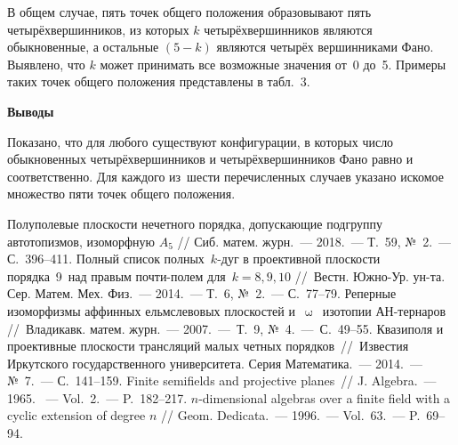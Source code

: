 В общем случае, пять точек общего положения образовывают пять  четырёхвершинников, из которых $k$ четырёхвершинников являются обыкновенные, а остальные $(5-k)$ являются четырёх вершинниками Фано. Выявлено, что $k$ может принимать все возможные значения от~0 до~5. Примеры таких точек общего положения представлены в табл.~3.


\textbf{Выводы}

Показано, что для любого существуют конфигурации, в которых число обыкновенных четырёхвершинников и четырёхвершинников Фано равно и
соответственно. Для каждого из~шести перечисленных случаев указано искомое множество пяти точек общего положения.




\begin{thebibliography}{99}

\bibitem{} Полуполевые плоскости нечетного порядка, допускающие подгруппу автотопизмов, изоморфную $A_5$ // Сиб. матем. журн.~--- 2018.~--- Т.~59, №~2.~--- С.~396--411.
\bibitem{} Полный список полных $k$-дуг в проективной плоскости порядка 9 над правым почти-полем для $k=8, 9, 10$ // Вестн. Южно-Ур. ун-та. Сер. Матем. Мех. Физ.~--- 2014.~--- Т.~6, №~2.~--- С.~77--79.
\bibitem{} Реперные изоморфизмы аффинных ельмслевовых плоскостей и $\upomega$ изотопии АН-тернаров // Владикавк. матем. журн.~--- 2007.~--- Т.~9, №~4.~--- С.~49--55.
\bibitem{} Квазиполя и проективные плоскости трансляций малых четных порядков~// Известия Иркутского государственного университета. Серия Математика.~--- 2014.~--- №~7.~--- С.~141--159.
\bibitem{} Finite semifields and projective planes~// J. Algebra.~--- 1965. ~--- Vol.~2.~--- P.~182--217.
\bibitem{} $n$-dimensional algebras over a finite field with a cyclic extension of degree $n$ // Geom. Dedicata.~--- 1996.~--- Vol.~63.~--- P.~69--94.


\end{thebibliography}
